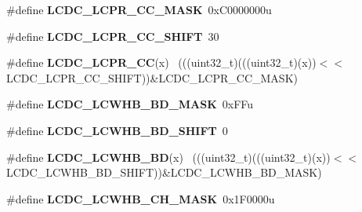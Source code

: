 \begin{DoxyCompactItemize}
\item 
\hypertarget{group___l_c_d_c___register___masks_gafcb12b09835216adcc39c0db67004b06}{}\#define {\bfseries L\+C\+D\+C\+\_\+\+L\+C\+P\+R\+\_\+\+C\+C\+\_\+\+M\+A\+S\+K}~0x\+C0000000u\label{group___l_c_d_c___register___masks_gafcb12b09835216adcc39c0db67004b06}

\item 
\hypertarget{group___l_c_d_c___register___masks_ga5c0d0da37469711d8c9a857b20ed0291}{}\#define {\bfseries L\+C\+D\+C\+\_\+\+L\+C\+P\+R\+\_\+\+C\+C\+\_\+\+S\+H\+I\+F\+T}~30\label{group___l_c_d_c___register___masks_ga5c0d0da37469711d8c9a857b20ed0291}

\item 
\hypertarget{group___l_c_d_c___register___masks_ga392ad8806dd014361aaddc2c78175810}{}\#define {\bfseries L\+C\+D\+C\+\_\+\+L\+C\+P\+R\+\_\+\+C\+C}(x)                                                ~(((uint32\+\_\+t)(((uint32\+\_\+t)(x))$<$$<$L\+C\+D\+C\+\_\+\+L\+C\+P\+R\+\_\+\+C\+C\+\_\+\+S\+H\+I\+F\+T))\&L\+C\+D\+C\+\_\+\+L\+C\+P\+R\+\_\+\+C\+C\+\_\+\+M\+A\+S\+K)\label{group___l_c_d_c___register___masks_ga392ad8806dd014361aaddc2c78175810}

\item 
\hypertarget{group___l_c_d_c___register___masks_gaa11a02cc9d208ffd1610ee2ba614fc9e}{}\#define {\bfseries L\+C\+D\+C\+\_\+\+L\+C\+W\+H\+B\+\_\+\+B\+D\+\_\+\+M\+A\+S\+K}~0x\+F\+Fu\label{group___l_c_d_c___register___masks_gaa11a02cc9d208ffd1610ee2ba614fc9e}

\item 
\hypertarget{group___l_c_d_c___register___masks_gaa3c952f31eccbe934b478549bbcfc433}{}\#define {\bfseries L\+C\+D\+C\+\_\+\+L\+C\+W\+H\+B\+\_\+\+B\+D\+\_\+\+S\+H\+I\+F\+T}~0\label{group___l_c_d_c___register___masks_gaa3c952f31eccbe934b478549bbcfc433}

\item 
\hypertarget{group___l_c_d_c___register___masks_gaeea441504e3b36fadd29c2c104b15d60}{}\#define {\bfseries L\+C\+D\+C\+\_\+\+L\+C\+W\+H\+B\+\_\+\+B\+D}(x)                                              ~(((uint32\+\_\+t)(((uint32\+\_\+t)(x))$<$$<$L\+C\+D\+C\+\_\+\+L\+C\+W\+H\+B\+\_\+\+B\+D\+\_\+\+S\+H\+I\+F\+T))\&L\+C\+D\+C\+\_\+\+L\+C\+W\+H\+B\+\_\+\+B\+D\+\_\+\+M\+A\+S\+K)\label{group___l_c_d_c___register___masks_gaeea441504e3b36fadd29c2c104b15d60}

\item 
\hypertarget{group___l_c_d_c___register___masks_ga4eb282e4373e34a5fb8be067712e9d90}{}\#define {\bfseries L\+C\+D\+C\+\_\+\+L\+C\+W\+H\+B\+\_\+\+C\+H\+\_\+\+M\+A\+S\+K}~0x1\+F0000u\label{group___l_c_d_c___register___masks_ga4eb282e4373e34a5fb8be067712e9d90}


\end{DoxyCompactItemize}
